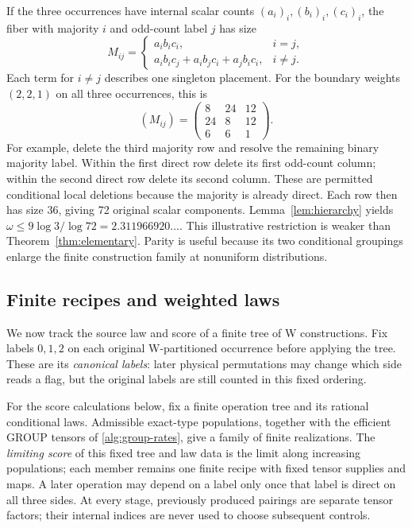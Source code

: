 \documentclass[11pt]{article}
\numberwithin{equation}{section}
\theoremstyle{definition}
\theoremstyle{remark}
\begin{document}
If the three occurrences have internal scalar counts
\((a_i)_i,(b_i)_i,(c_i)_i\), the fiber with majority \(i\) and odd-count
label \(j\) has size
\begin{equation}
 M_{ij}=
 \begin{cases}
  a_ib_ic_i,&i=j,\\
  a_ib_ic_j+a_ib_jc_i+a_jb_ic_i,&i\ne j.
 \end{cases}
 \label{alg:parity-weights}
\end{equation}
Each term for \(i\ne j\) describes one singleton placement.
For the boundary weights \((2,2,1)\) on all three occurrences, this is
\[
 (M_{ij})=\begin{pmatrix}8&24&12\\24&8&12\\6&6&1\end{pmatrix}.
\]
For example, delete the third majority row and resolve the remaining
binary majority label.  Within the first direct row delete its first
odd-count column; within the second direct row delete its second column.
These are permitted conditional local deletions because the majority is
already direct.  Each row then has size 36, giving 72 original scalar
components.  Lemma~\ref{lem:hierarchy} yields
\(\omega\leq9\log3/\log72=2.311966920\ldots\).
This illustrative restriction is weaker than Theorem~\ref{thm:elementary}.
Parity is useful because its two conditional groupings enlarge the finite
construction family at nonuniform distributions.

\subsection{Finite recipes and weighted laws}
\label{alg:recipes}

We now track the source law and score of a finite tree of W constructions.
Fix labels \(0,1,2\) on each original W-partitioned occurrence before
applying the tree.  These are its \emph{canonical labels}: later physical
permutations may change which side reads a flag, but the original labels
are still counted in this fixed ordering.

For the score calculations below, fix a finite operation tree and its
rational conditional laws.  Admissible exact-type populations, together
with the efficient GROUP tensors of \eqref{alg:group-rates}, give a family
of finite realizations.  The \emph{limiting score} of this fixed tree and
law data is the limit along increasing populations; each member remains
one finite recipe with fixed tensor supplies and maps.
A later operation may depend on a label only once that label is direct on
all three sides.  At every stage, previously produced pairings are separate
tensor factors; their internal indices are never used to choose subsequent
controls.
\end{document}
